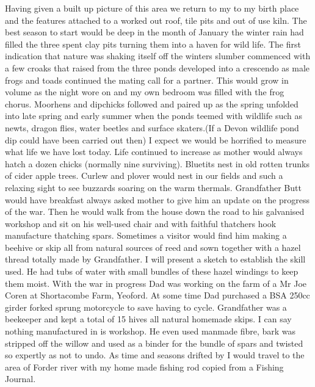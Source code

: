 Having given a built up picture of this area we return to my to my birth place
and the features attached to a worked out roof, tile pits and out of use kiln.
The best season to start would be deep in the month of January the winter rain
had filled the three spent clay pits turning them into a haven for wild life.
The first indication that nature was shaking itself off the winters slumber
commenced with a few croaks that raised from the three ponds developed into a
crescendo as male frogs and toads continued the mating call for a partner. This
would grow in volume as the night wore on and my own bedroom was filled with
the frog chorus. Moorhens and dipchicks followed and paired up as the spring
unfolded into late spring and early summer when the ponds teemed with wildlife
such as newts, dragon flies, water beetles and surface skaters.(If a Devon
wildlife pond dip could have been carried out then) I expect we would be
horrified to measure what life we have lost today. Life continued to increase
as mother would always hatch a dozen chicks (normally nine surviving). Bluetits
nest in old rotten trunks of cider apple trees. Curlew and plover would nest in
our fields and such a relaxing sight to see buzzards soaring on the warm
thermals. Grandfather Butt would have breakfast always asked mother to give him
an update on the progress of the war. Then he would walk from the house down
the road to his galvanised workshop and sit on his well-used chair and with
faithful thatchers hook manufacture thatching spars. Sometimes a visitor would
find him making a beehive or skip all from natural sources of reed and sown
together with a hazel thread totally made by Grandfather. I will present a
sketch to establish the skill used. He had tubs of water with small bundles of
these hazel windings to keep them moist. With the war in progress Dad was
working on the farm of a Mr Joe Coren at Shortacombe Farm, Yeoford. At some
time Dad purchased a BSA 250cc girder forked sprung motorcycle to save having
to cycle. Grandfather was a beekeeper and kept a total of 15 hives all natural
homemade skips. I can say nothing manufactured in is workshop. He even used
manmade fibre, bark was stripped off the willow and used as a binder for the
bundle of spars and twisted so expertly as not to undo. As time and seasons
drifted by I would travel to the area of Forder river with my home made fishing
rod copied from a Fishing Journal.

